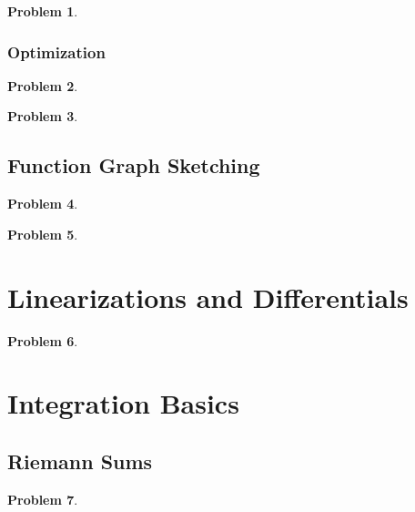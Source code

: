 \documentclass{article}
\newtheorem{problem}{Problem}
\begin{document}
\begin{problem}

\end{problem}

\subsubsection{Optimization}\label{secMPSoptimization}
\begin{problem}

\end{problem}
\begin{problem}

\end{problem}


\subsection{Function Graph Sketching}\label{secMPSfunctionGraphSketching}
\begin{problem}

\end{problem}


\begin{problem}

\end{problem}

\section{Linearizations and Differentials} \label{secMPSLinearizationAndDifferentials}
\begin{problem}

\end{problem}


\section{Integration Basics}
\subsection{Riemann Sums}\label{secMPSRiemannSums}
\begin{problem}

\end{problem}

\end{document}
